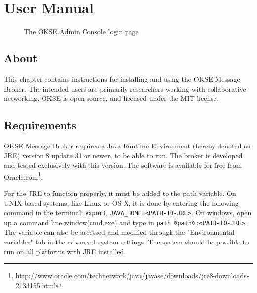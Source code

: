 \chapter{User Manual}
\label{appendix-user-manual}

\begin{center}
  \begin{figure}[ht!]
    \caption{The OKSE Admin Console login page} 
    \label{fig:OKSE Admin Console login page}
  \end{figure}
\end{center}

\section{About}

This chapter contains instructions for installing and using the OKSE Message Broker. The intended users are primarily researchers working with collaborative networking. OKSE is open source, and licensed under the MIT license.

\section{Requirements}

OKSE Message Broker requires a Java Runtime Environment (hereby denoted as JRE) version 8 update 31 or newer, to be able to run. The broker is developed and tested exclusively with this version. The software is available for free from Oracle.com\footnote{\url{http://www.oracle.com/technetwork/java/javase/downloads/jre8-downloads-2133155.html}}.

For the JRE to function properly, it must be added to the path variable. On UNIX-based systems, like Linux or OS X, it is done by entering the following command in the terminal: \verb!export JAVA_HOME=<PATH-TO-JRE>!. On windows, open up a command line window(cmd.exe) and type in  \verb!path %path%;<PATH-TO-JRE>!.
The variable can also be accessed and modified through the "Environmental variables" tab in the advanced system settings. The system should be possible to run on all platforms with JRE installed. 

